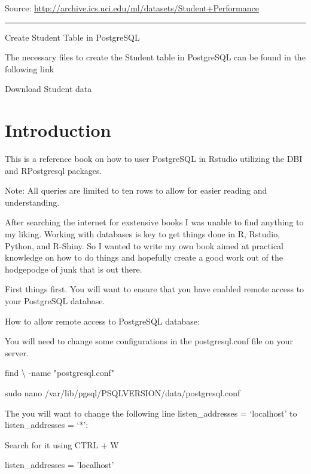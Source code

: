 \documentclass[]{book}
\newenvironment{Shaded}{\begin{snugshade}}{\end{snugshade}}
\newcommand{\DataTypeTok}[1]{\textcolor[rgb]{0.13,0.29,0.53}{#1}}
\newcommand{\StringTok}[1]{\textcolor[rgb]{0.31,0.60,0.02}{#1}}
\newcommand{\FunctionTok}[1]{\textcolor[rgb]{0.00,0.00,0.00}{#1}}
\newcommand{\ExtensionTok}[1]{#1}
\newcommand{\NormalTok}[1]{#1}
\begin{document}
Source: \url{http://archive.ics.uci.edu/ml/datasets/Student+Performance}

\begin{center}\rule{0.5\linewidth}{\linethickness}\end{center}

Create Student Table in PostgreSQL

The necessary files to create the Student table in PostgreSQL can be
found in the following link

Download Student data

\chapter{Introduction}\label{introduction}

This is a reference book on how to user PostgreSQL in Rstudio utilizing
the DBI and RPostgresql packages.

Note: All queries are limited to ten rows to allow for easier reading
and understanding.

After searching the internet for exstensive books I was unable to find
anything to my liking. Working with databases is key to get things done
in R, Rstudio, Python, and R-Shiny. So I wanted to write my own book
aimed at practical knowledge on how to do things and hopefully create a
good work out of the hodgepodge of junk that is out there.

First things first. You will want to ensure that you have enabled remote
access to your PostgreSQL database.

How to allow remote access to PostgreSQL database:

You will need to change some configurations in the postgresql.conf file
on your server.

\begin{Shaded}
\begin{Highlighting}[]
\FunctionTok{find} \DataTypeTok{\textbackslash{} }\NormalTok{-name }\StringTok{"postgresql.conf"}

\FunctionTok{sudo}\NormalTok{ nano /var/lib/pgsql/PSQLVERSION/data/postgresql.conf}
\end{Highlighting}
\end{Shaded}

The you will want to change the following line listen\_addresses =
`localhost' to listen\_addresses = `*':

Search for it using CTRL + W

\begin{Shaded}
\begin{Highlighting}[]
\ExtensionTok{listen_addresses}\NormalTok{ = }\StringTok{'localhost'}
\end{Highlighting}
\end{Shaded}
\end{document}
